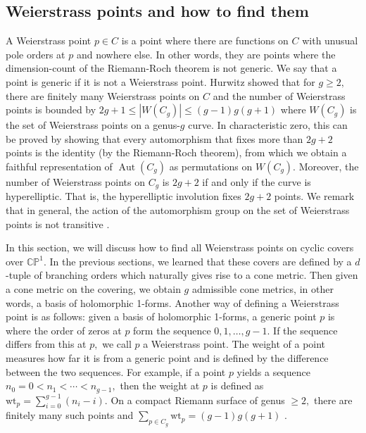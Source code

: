 \documentclass[12pt,reqno]{amsart}
\DeclareMathOperator{\Aut}{Aut}
\newtheorem*{proposition}{Proposition}
\theoremstyle{definition}
\theoremstyle{remark}
\begin{document}
\subsection{Weierstrass points and how to find them}

A Weierstrass point $p \in C$ is a point where there are functions on $C$ with unusual pole orders at $p$ and nowhere else. In other words, they are points where the dimension-count of the Riemann-Roch theorem is not generic. We say that a point is generic if it is not a Weierstrass point. Hurwitz showed that for $g \geq 2,$ there are finitely many Weierstrass points on $C$ and the number of Weierstrass points is bounded by $2 g + 1 \leq |W(C_g)| \leq (g - 1) g (g + 1)$ where $W(C_g)$ is the set of Weierstrass points on a genus-$g$ curve. In characteristic zero, this can be proved by showing that every automorphism that fixes more than $2 g + 2$ points is the identity (by the Riemann-Roch theorem), from which we obtain a faithful representation of $\Aut(C_g)$ as permutations on $W(C_g)$. Moreover, the number of Weierstrass points on $C_g$ is $2 g + 2$ if and only if the curve is hyperelliptic. That is, the hyperelliptic involution fixes $2 g + 2$ points. We remark that in general, the action of the automorphism group on the set of Weierstrass points is not transitive \cite{sl}. 


In this section, we will discuss how to find all Weierstrass points on cyclic covers over $\mathbb{C}\mathbb{P}^1.$ In the previous sections, we learned that these covers are defined by a $d$-tuple of branching orders which naturally gives rise to a cone metric. Then given a cone metric on the covering, we obtain $g$ admissible cone metrics, in other words, a basis of holomorphic 1-forms. Another way of defining a Weierstrass point is as follows: given a basis of holomorphic 1-forms, a generic point $p$ is where the order of zeros at $p$ form the sequence $0, 1, \ldots , g - 1.$ If the sequence differs from this at $p,$ we call $p$ a Weierstrass point. The weight of a point measures how far it is from a generic point and is defined by the difference between the two sequences. For example, if a point $p$ yields a sequence $n_0 = 0 < n_1 < \cdots < n_{g-1},$ then the weight at $p$ is defined as $\textrm{wt}_p = \sum\limits_{i=0}^{g-1} (n_i - i).$ On a compact Riemann surface of genus $\geq 2,$ there are finitely many such points and $\sum\limits_{p \in C_g} \textrm{wt}_p = (g - 1) g (g + 1)$ \cite{fk}. 


\end{document}
